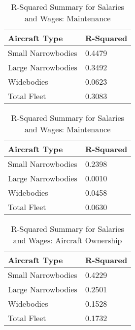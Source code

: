 \begin{table}[htbp]
    \centering
    \begin{minipage}{0.45\textwidth} %
        \centering
        \caption{R-Squared Summary for Salaries and Wages: Per Diem/Personnel}
        \begin{tabular}{@{}ll@{}}
            \toprule
            \textbf{Aircraft Type} & \textbf{R-Squared} \\ \midrule
            Small Narrowbodies     & 0.4479             \\
            Large Narrowbodies     & 0.3492             \\
            Widebodies             & 0.0623             \\
            Total Fleet            & 0.3083             \\ \bottomrule
        \end{tabular}
    \end{minipage}%
    \hspace{0.05\textwidth} %
    \begin{minipage}{0.45\textwidth}
        \centering
        \caption{R-Squared Summary for Salaries and Wages: Maintenance}
        \begin{tabular}{@{}ll@{}}
            \toprule
            \textbf{Aircraft Type} & \textbf{R-Squared} \\ \midrule
            Small Narrowbodies     & 0.2398             \\
            Large Narrowbodies     & 0.0010             \\
            Widebodies             & 0.0458             \\
            Total Fleet            & 0.0630             \\ \bottomrule
        \end{tabular}
    \end{minipage}
\end{table}

\begin{table}[htbp]
    \centering
    \begin{minipage}{0.45\textwidth} %
        \centering
        \caption{R-Squared Summary for Salaries and Wages: Aircraft Ownership}
        \begin{tabular}{@{}ll@{}}
            \toprule
            \textbf{Aircraft Type} & \textbf{R-Squared} \\ \midrule
            Small Narrowbodies     & 0.4229             \\
            Large Narrowbodies     & 0.2501             \\
            Widebodies             & 0.1528             \\
            Total Fleet            & 0.1732             \\ \bottomrule
        \end{tabular}
    \end{minipage}
\end{table}
